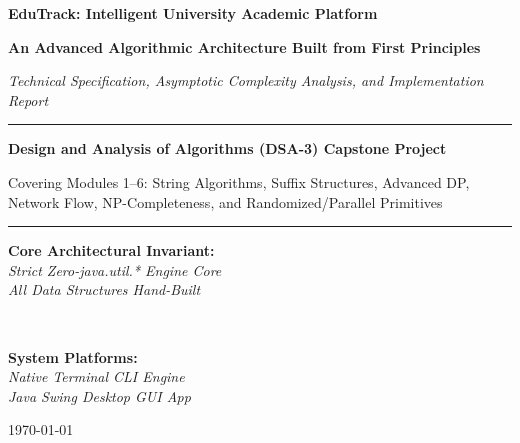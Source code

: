 \documentclass[12pt,a4paper,oneside]{report}
\begin{document}
\begin{titlepage}
    \centering
    \vspace*{1.5cm}
    
    {\Huge \bfseries EduTrack: Intelligent University Academic Platform\par}
    \vspace{0.6cm}
    {\LARGE \bfseries An Advanced Algorithmic Architecture Built from First Principles\par}
    \vspace{0.4cm}
    {\large \slshape Technical Specification, Asymptotic Complexity Analysis, and Implementation Report\par}
    
    \vspace{1.5cm}
    \rule{\linewidth}{1.5pt}\par
    \vspace{0.5cm}
    {\large \textbf{Design and Analysis of Algorithms (DSA-3) Capstone Project}}\par
    \vspace{0.2cm}
    {\normalsize Covering Modules 1--6: String Algorithms, Suffix Structures, Advanced DP, Network Flow, NP-Completeness, and Randomized/Parallel Primitives}\par
    \vspace{0.5cm}
    \rule{\linewidth}{1.5pt}\par
    
    \vspace{1.8cm}
    \begin{minipage}{0.48\textwidth}
        \begin{flushleft} \large
            \textbf{Core Architectural Invariant:}\\
            \textit{Strict Zero-java.util.* Engine Core}\\
            \textit{All Data Structures Hand-Built}
        \end{flushleft}
    \end{minipage}
    ~
    \begin{minipage}{0.48\textwidth}
        \begin{flushright} \large
            \textbf{System Platforms:}\\
            \textit{Native Terminal CLI Engine}\\
            \textit{Java Swing Desktop GUI App}
        \end{flushright}
    \end{minipage}
    
    \vfill
    {\large \today}\par
\end{titlepage}
\end{document}
